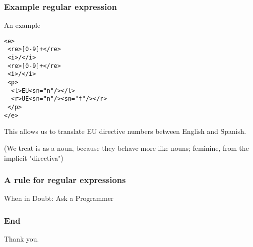 \documentclass{beamer} %
\begin{document}
\begin{frame}
  \frametitle{Example regular expression}

  \begin{exampleblock}{An example}
    \begin{footnotesize}
    \begin{alltt}
      <e> \\
      ~<re>[0-9]+</re> \\
      ~<i>/</i> \\
      ~<re>[0-9]+</re> \\
      ~<i>/</i> \\
      ~<p> \\
      ~~<l>EU<s n="n"/></l> \\
      ~~<r>UE<s n="n"/><s n="f"/></r> \\
      ~</p> \\
      </e> \\
    \end{alltt}
    \end{footnotesize}
  \end{exampleblock}

  This allows us to translate EU directive numbers between English and Spanish.

  \pause

  (We treat is as a noun, because they behave more like nouns; feminine, from the implicit "directiva")
\end{frame}
\begin{frame}
\frametitle{A rule for regular expressions}

 \begin{center}
 {\Large When in Doubt: Ask a Programmer}
 \end{center}
\end{frame}

\begin{frame}
\frametitle{End}

 \begin{center}
 Thank you.
 \end{center}
\end{frame}
\end{document}
